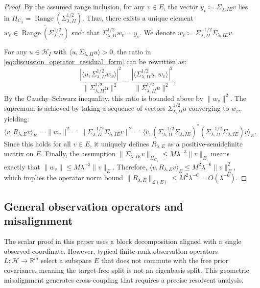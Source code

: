 \documentclass[11pt]{amsart}
\theoremstyle{plain}
\theoremstyle{definition}
\theoremstyle{remark}
\begin{document}
\begin{proof}
  By the assumed range inclusion, for any $v \in E$, the vector $y_v \coloneqq \Sigma_{\lambda,IE} v$ lies in $H_{C_\lambda} = \operatorname{Range}(\Sigma_{\lambda,II}^{1/2})$. Thus, there exists a unique element $w_v \in \overline{\operatorname{Range}(\Sigma_{\lambda,II}^{1/2})}$ such that $\Sigma_{\lambda,II}^{1/2} w_v = y_v$. We denote $w_v \coloneqq \Sigma_{\lambda,II}^{-1/2} \Sigma_{\lambda,IE} v$.
  
  For any $u \in \mathcal{H}_I$ with $\langle u, \Sigma_{\lambda,II} u \rangle > 0$, the ratio in \eqref{eq:discussion_operator_residual_form} can be rewritten as:
  \[
    \frac{|\langle u, \Sigma_{\lambda,II}^{1/2} w_v \rangle|^2}{\|\Sigma_{\lambda,II}^{1/2} u\|^2} = \frac{|\langle \Sigma_{\lambda,II}^{1/2} u, w_v \rangle|^2}{\|\Sigma_{\lambda,II}^{1/2} u\|^2}.
  \]
  By the Cauchy--Schwarz inequality, this ratio is bounded above by $\|w_v\|^2$. The supremum is achieved by taking a sequence of vectors $\Sigma_{\lambda,II}^{1/2} u$ converging to $w_v$, yielding:
  \[
    \langle v, R_{\lambda,E} v \rangle_E = \|w_v\|^2 = \|\Sigma_{\lambda,II}^{-1/2} \Sigma_{\lambda,IE} v\|^2 = \langle v, (\Sigma_{\lambda,II}^{-1/2}\Sigma_{\lambda,IE})^* (\Sigma_{\lambda,II}^{-1/2}\Sigma_{\lambda,IE}) v \rangle_E.
  \]
  Since this holds for all $v \in E$, it uniquely defines $R_{\lambda,E}$ as a positive-semidefinite matrix on $E$. Finally, the assumption $\|\Sigma_{\lambda,IE} v\|_{H_{C_\lambda}} \le M \lambda^{-3} \|v\|_E$ means exactly that $\|w_v\| \le M \lambda^{-3} \|v\|_E$. Therefore, $\langle v, R_{\lambda,E} v \rangle_E \le M^2 \lambda^{-6} \|v\|_E^2$, which implies the operator norm bound $\|R_{\lambda,E}\|_{\mathcal{L}(E)} \le M^2 \lambda^{-6} = O(\lambda^{-6})$.
\end{proof}

\subsection{General observation operators and misalignment}
\label{sec:discussion:misalignment}

The scalar proof in this paper uses a block decomposition aligned with a single observed coordinate. However, typical finite-rank observation operators $L:\mathcal H\to\mathbb R^m$ select a subspace $E$ that does not commute with the free prior covariance, meaning the target-free split is not an eigenbasis split. This geometric misalignment generates cross-coupling that requires a precise resolvent analysis.
\end{document}
